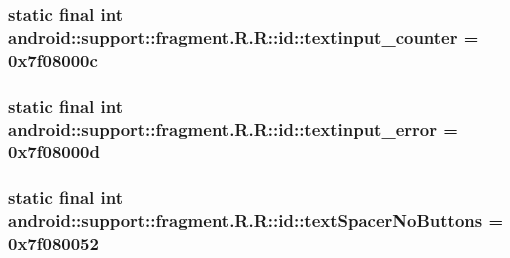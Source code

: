 \hypertarget{classandroid_1_1support_1_1fragment_1_1_r_1_1id_d4b31d82e241686d083c098f6e4cd9b9}{
\subsubsection[{textinput\_\-counter}]{\setlength{\rightskip}{0pt plus 5cm}static final int android::support::fragment.R.R::id::textinput\_\-counter = 0x7f08000c}}
\label{classandroid_1_1support_1_1fragment_1_1_r_1_1id_d4b31d82e241686d083c098f6e4cd9b9}


\hypertarget{classandroid_1_1support_1_1fragment_1_1_r_1_1id_5ed019c4a8fbca91e418b838e15df9f1}{
\subsubsection[{textinput\_\-error}]{\setlength{\rightskip}{0pt plus 5cm}static final int android::support::fragment.R.R::id::textinput\_\-error = 0x7f08000d}}
\label{classandroid_1_1support_1_1fragment_1_1_r_1_1id_5ed019c4a8fbca91e418b838e15df9f1}


\hypertarget{classandroid_1_1support_1_1fragment_1_1_r_1_1id_317e1d3a9697e8f380b9c4ede77d9044}{
\subsubsection[{textSpacerNoButtons}]{\setlength{\rightskip}{0pt plus 5cm}static final int android::support::fragment.R.R::id::textSpacerNoButtons = 0x7f080052}}
\label{classandroid_1_1support_1_1fragment_1_1_r_1_1id_317e1d3a9697e8f380b9c4ede77d9044}


